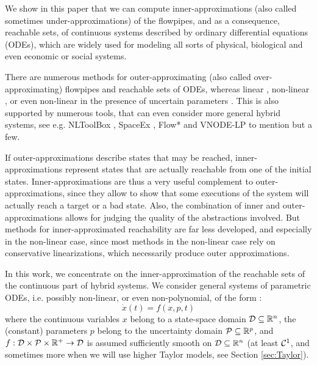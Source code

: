 \documentclass{sig-alternate-05-2015} %
\def\R{{\mathbb R}}
\begin{document}
We show in this paper that we can compute inner-approxi\-mations (also called sometimes 
under-approximations) of the flowpipes, and as a consequence, reachable sets, 
of continuous systems described by ordinary differential
equations (ODEs), which 
are widely used for modeling all sorts of physical, biological and even economic or
social systems. 

There are numerous methods for outer-approximating (also called over-approximating) flowpipes
and reachable sets of ODEs, whereas linear \cite{GirardLinear06,LeGuernic09}, non-linear \cite{Nedialkov99,Dang4,Dang3}, or even non-linear
in the presence of uncertain parameters \cite{GirardHSCC2005}. This is also 
supported by numerous tools,
that can even consider more general hybrid systems, see e.g. NLToolBox \cite{NLTOOLBOX}, 
SpaceEx \cite{SPACEEX}, Flow* \cite{FLOW} and VNODE-LP \cite{VNODELP} to mention but a few.  

If outer-approximations describe states that may be rea\-ched, inner-approximations represent
states that are actually reachable from one of the initial states. Inner-approxima\-tions are
thus a very useful complement to  outer-approxima\-tions, since they allow to show
that some executions of the system will actually reach a target or a bad state. Also, the combination of
inner and outer-approximations allows for judging the quality of the abstractions involved. 
But methods for inner-approximated reachability are far less developed, and especially in the non-linear case, 
since most methods in the non-linear case rely on conservative linearizations, which necessarily produce outer approximations.

In this work, we concentrate on the inner-approximation of the reachable sets of
the continuous part of hybrid systems. %
We consider general systems of parametric ODEs, i.e. possibly non-linear, or
even non-polyno\-mial, of the form : 
\begin{equation}
\dot{x}(t) = f(x,p,t)
\label{eq:flow}
\end{equation}
\noindent where the continuous variables $x$ belong to a state-space domain 
${\cal D} \subseteq \R^n$, the (constant) parameters $p$ belong to the uncertainty domain
${\cal P} \subseteq \R^p$, and 
$f: {\cal D} \times {\cal P} \times \R^+ \rightarrow {\cal D}$ is assumed sufficiently smooth 
on ${\cal D} \subseteq \R^n$ (at least ${\cal C}^1$, and sometimes more when we will use higher
Taylor models, see Section \ref{sec:Taylor}).
\end{document}
